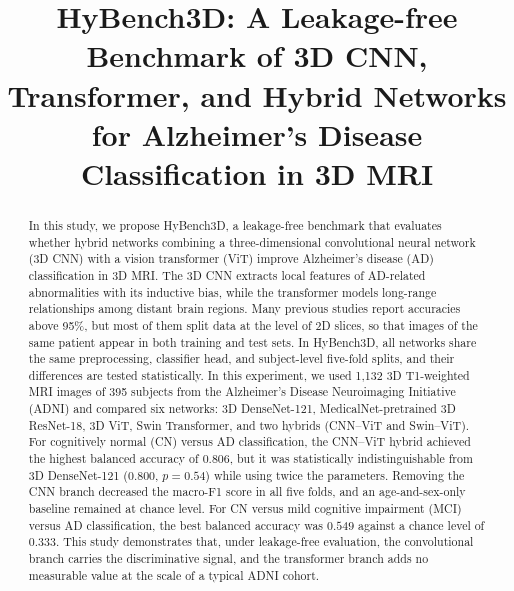 \documentclass[conference,a4paper]{IEEEtran}
\begin{document}
\title{HyBench3D: A Leakage-free Benchmark of 3D CNN, Transformer, and Hybrid Networks for Alzheimer's Disease Classification in 3D MRI}

\author{
}

\maketitle

\begin{abstract}
In this study, we propose HyBench3D, a leakage-free benchmark that evaluates whether hybrid networks combining a three-dimensional convolutional neural network (3D CNN) with a vision transformer (ViT) improve Alzheimer's disease (AD) classification in 3D MRI. The 3D CNN extracts local features of AD-related abnormalities with its inductive bias, while the transformer models long-range relationships among distant brain regions. Many previous studies report accuracies above 95\%, but most of them split data at the level of 2D slices, so that images of the same patient appear in both training and test sets. In HyBench3D, all networks share the same preprocessing, classifier head, and subject-level five-fold splits, and their differences are tested statistically. In this experiment, we used 1{,}132 3D T1-weighted MRI images of 395 subjects from the Alzheimer's Disease Neuroimaging Initiative (ADNI) and compared six networks: 3D DenseNet-121, MedicalNet-pretrained 3D ResNet-18, 3D ViT, Swin Transformer, and two hybrids (CNN--ViT and Swin--ViT). For cognitively normal (CN) versus AD classification, the CNN--ViT hybrid achieved the highest balanced accuracy of $0.806$, but it was statistically indistinguishable from 3D DenseNet-121 ($0.800$, $p=0.54$) while using twice the parameters. Removing the CNN branch decreased the macro-F1 score in all five folds, and an age-and-sex-only baseline remained at chance level. For CN versus mild cognitive impairment (MCI) versus AD classification, the best balanced accuracy was $0.549$ against a chance level of $0.333$. This study demonstrates that, under leakage-free evaluation, the convolutional branch carries the discriminative signal, and the transformer branch adds no measurable value at the scale of a typical ADNI cohort.
\end{abstract}
\end{document}
